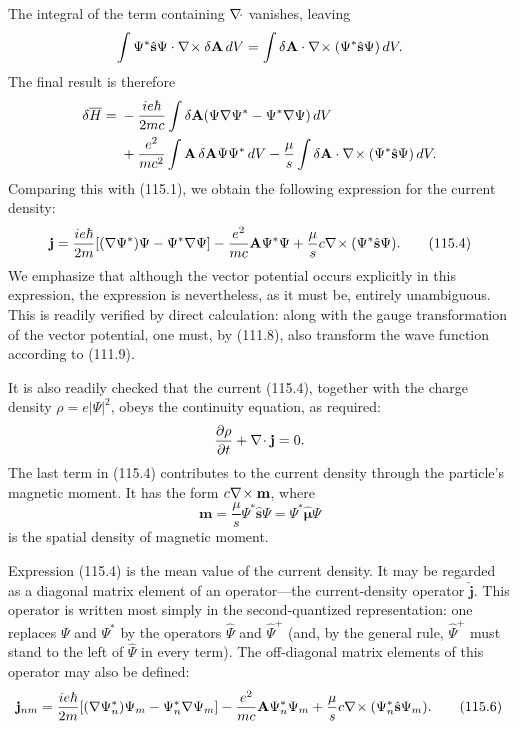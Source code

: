 The integral of the term containing $\nabla\!\cdot$ vanishes, leaving
\[
 \int\Psi^*\hat{\mathbf s}\Psi\cdot\nabla\!\times \delta\mathbf A\,dV
 =\int\delta\mathbf A\cdot\nabla\!\times (\Psi^*\hat{\mathbf s}\Psi)\,dV.
\]
The final result is therefore
\begin{align*}
 \delta\overline H={}&-\frac{ie\hbar}{2mc}\int\delta\mathbf A
 (\Psi\nabla\Psi^*-\Psi^*\nabla\Psi)\,dV\\
 &+\frac{e^2}{mc^2}\int\mathbf A\,\delta\mathbf A\Psi\Psi^*\,dV
 -\frac\mu s\int\delta\mathbf A\cdot\nabla\!\times (\Psi^*\hat{\mathbf s}\Psi)\,dV.
\end{align*}
Comparing this with (115.1), we obtain the following expression for the current
density:
\begin{equation}
 \mathbf j=\frac{ie\hbar}{2m}
 [ (\nabla\Psi^*)\Psi-\Psi^*\nabla\Psi]
 -\frac{e^2}{mc}\mathbf A\Psi^*\Psi
 +\frac\mu s c\nabla\!\times (\Psi^*\hat{\mathbf s}\Psi).
 \tag{115.4}
\end{equation}
We emphasize that although the vector potential occurs explicitly in this
expression, the expression is nevertheless, as it must be, entirely
unambiguous. This is readily verified by direct calculation: along with the
gauge transformation of the vector potential, one must, by (111.8), also
transform the wave function according to (111.9).

It is also readily checked that the current (115.4), together with the charge
density $\rho=e|\Psi|^2$, obeys the continuity equation, as required:
\[
 \frac{\partial\rho}{\partial t}+\nabla\!\cdot \mathbf j=0.
\]
The last term in (115.4) contributes to the current density through the
particle's magnetic moment. It has the form $c\nabla\!\times \mathbf m$, where
\begin{equation}
 \mathbf m=\frac\mu s\Psi^*\hat{\mathbf s}\Psi
 =\Psi^*\hat{\boldsymbol\mu}\Psi
 \tag{115.5}
\end{equation}
is the spatial density of magnetic moment.

Expression (115.4) is the mean value of the current density. It may be regarded
as a diagonal matrix element of an operator---the current-density operator
$\hat{\mathbf j}$. This operator is written most simply in the
second-quantized representation: one replaces $\Psi$ and $\Psi^*$ by the
operators $\hat\Psi$ and $\hat\Psi^+$ (and, by the general rule,
$\hat\Psi^+$ must stand to the left of $\hat\Psi$ in every term). The
off-diagonal matrix elements of this operator may also be defined:
\begin{equation}
 \mathbf j_{nm}=\frac{ie\hbar}{2m}
 [ (\nabla\Psi_n^*)\Psi_m-\Psi_n^*\nabla\Psi_m]
 -\frac{e^2}{mc}\mathbf A\Psi_n^*\Psi_m
 +\frac\mu s c\nabla\!\times (\Psi_n^*\hat{\mathbf s}\Psi_m).
 \tag{115.6}
\end{equation}
